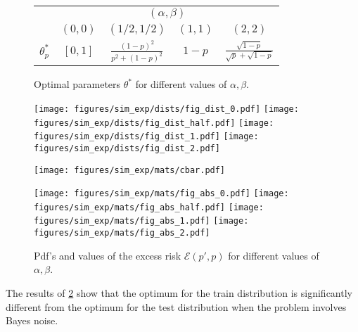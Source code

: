 \documentclass[12pt]{article}
\begin{document}
\begin{figure}[h]
    \centering
    \begin{tabular}[h]{lcccc}
	\toprule
	   	& \multicolumn{4}{c}{$(\alpha, \beta)$} \\
	 \cmidrule(lr){2-5}
	 & $(0,0)$ & $(1/2, 1/2)$ & $(1,1)$ & $(2,2)$ \\
	 \midrule
	 \smallskip
	$\theta^*_p$ & $[0,1]$ & $\frac{(1-p)^2}{p^2 + (1-p)^2}$ &
	$1-p$ &  $\frac{\sqrt{1-p}}{\sqrt{p} + \sqrt{1-p}}$\\
	 \bottomrule
    \end{tabular}
    \caption{Optimal parameters $\theta^*$ for different values of $\alpha, \beta$.}
    \label{fig:tab_sim_exp}
\end{figure}

\begin{figure}[h]
    \centering

	\texttt{[image: figures/sim\_exp/dists/fig\_dist\_0.pdf]}
    \endminipage
    \hfill
	\texttt{[image: figures/sim\_exp/dists/fig\_dist\_half.pdf]}
    \endminipage
    \hfill
	\texttt{[image: figures/sim\_exp/dists/fig\_dist\_1.pdf]}
    \endminipage
    \hfill
	\texttt{[image: figures/sim\_exp/dists/fig\_dist\_2.pdf]}
    \endminipage

    \texttt{[image: figures/sim\_exp/mats/cbar.pdf]}

	\texttt{[image: figures/sim\_exp/mats/fig\_abs\_0.pdf]}
    \endminipage
    \hfill
	\texttt{[image: figures/sim\_exp/mats/fig\_abs\_half.pdf]}
    \endminipage
    \hfill
	\texttt{[image: figures/sim\_exp/mats/fig\_abs\_1.pdf]}
    \endminipage
    \hfill
	\texttt{[image: figures/sim\_exp/mats/fig\_abs\_2.pdf]}
    \endminipage

    \caption{Pdf's and values of the excess risk $\mathcal{E}(p',p)$ for
    different values of $\alpha, \beta$.}
    \label{fig:plot_sim_exp}
\end{figure}

The results of \cref{fig:plot_sim_exp} show that the optimum for the train 
distribution is significantly different from the optimum for the test distribution
when the problem involves Bayes noise.
\end{document}
